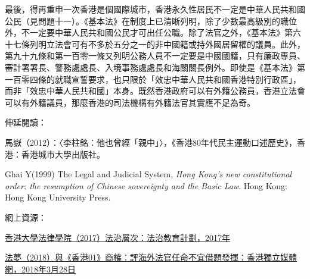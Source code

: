 最後，得再重申一次香港是個國際城市，香港永久性居民不一定是中華人民共和國公民（見問題十一）。《基本法》在制度上已清晰列明，除了少數最高級別的職位外，不一定要中華人民共和國公民才可出任公職。除了法官之外，《基本法》第六十七條列明立法會可有不多於五分之一的非中國籍或持外國居留權的議員。此外，第九十九條和第一百零一條又列明公務人員不一定要是中國國籍，只有廉政專員、審計署署長、警務處處長、入境事務處處長和海關關長例外。即使是《基本法》第一百零四條的就職宣誓要求，也只限於「效忠中華人民共和國香港特別行政區」，而非「效忠中華人民共和國」本身。既然香港政府可以有外籍公務員，香港立法會可以有外籍議員，那麼香港的司法機構有外籍法官其實應不足為奇。



伸延閱讀：

馬嶽（2012）：〈李柱銘：他也曾經「親中」〉，《香港80年代民主運動口述歷史》，香港：香港城市大學出版社。

Ghai Y(1999) The Legal and Judicial System, \textit{Hong Kong's new constitutional order: the resumption of Chinese sovereignty and the Basic Law}. Hong Kong: Hong Kong University Press.

網上資源：

\href{http://www.role.hku.hk/levels}{香港大學法律學院（2017）法治層次：法治教育計劃，2017年}

\href{https://www.inmediahk.net/node/1056029}{法夢（2018）與《香港01》商榷︰評海外法官任命不宜借題發揮：香港獨立媒體網，2018年3月28日}